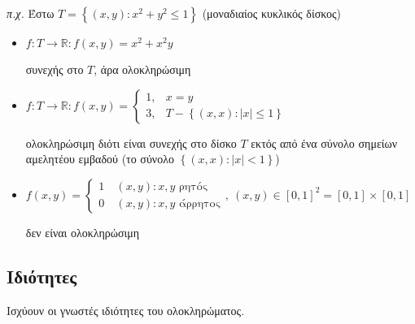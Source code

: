 \documentclass[11pt,a4paper,titlepage,draft]{article}
\begin{document}
\textit{π.χ.}
Έστω \( T =  \left\lbrace (x,y): x^2+y^2 \leq 1  \right\rbrace\) (μοναδιαίος κυκλικός δίσκος)

\begin{itemize}
\item \(f:T \to \mathbb{R}: f(x,y)=x^2+x^2y\)

συνεχής στο \(T\), άρα ολοκληρώσιμη
\item \(f:T\to \mathbb R : f(x,y) = \begin{cases}1,&x=y\\3,&T- \left\lbrace (x,x):|x| \leq 1 \right\rbrace \end{cases}\) %

ολοκληρώσιμη διότι είναι συνεχής στο δίσκο \(T\) εκτός από ένα σύνολο σημείων αμελητέου εμβαδού (το σύνολο \( \left\lbrace (x,x): |x|<1 \right\rbrace\))

\item \(f(x,y) = \begin{cases}1 \ & (x,y): x,y \text{ ρητός}
\\
0& (x,y): x,y \text{ άρρητος}
\end{cases},\ (x,y) \in [0,1]^2 = [0,1] \times [0,1]
\)

δεν είναι ολοκληρώσιμη
\end{itemize}

\subsection{Ιδιότητες}

Ισχύουν οι γνωστές ιδιότητες του ολοκληρώματος.
\end{document}

